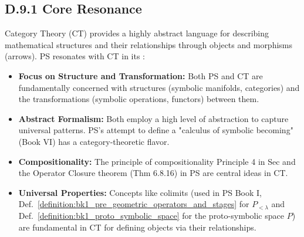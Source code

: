\subsection*{D.9.1 Core Resonance}
\label{subsec:appD_category_theory_core_resonance}
Category Theory (CT) provides a highly abstract language for describing mathematical structures and their relationships through objects and morphisms (arrows). PS resonates with CT in its \cite{maclane1971}:
\begin{itemize}
    \item \textbf{Focus on Structure and Transformation:} Both PS and CT are fundamentally concerned with structures (symbolic manifolds, categories) and the transformations (symbolic operations, functors) between them.
    \item \textbf{Abstract Formalism:} Both employ a high level of abstraction to capture universal patterns. PS's attempt to define a "calculus of symbolic becoming" (Book VI) has a category-theoretic flavor.
    \item \textbf{Compositionality:} The principle of compositionality Principle 4 in Sec and the Operator Closure theorem (Thm 6.8.16) in PS are central ideas in CT.
    \item \textbf{Universal Properties:} Concepts like colimits (used in PS Book I, Def.~\ref{definition:bk1_pre_geometric_operators_and_stages} for \(P_{<\lambda}\) and Def.~\ref{definition:bk1_proto_symbolic_space} for the proto-symbolic space \(P\)) are fundamental in CT for defining objects via their relationships.
\end{itemize}
